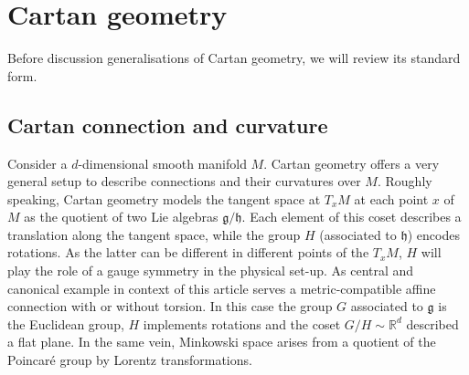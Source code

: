 \documentclass[11pt,a4paper]{article}
\numberwithin{equation}{section}
\begin{document}
\section{Cartan geometry} \label{chap:CartanGeometryOrdinary}
Before discussion generalisations of Cartan geometry, we will review its standard form.
\subsection{Cartan connection and curvature}
Consider a $d$-dimensional smooth manifold $M$. Cartan geometry offers a very general setup to describe connections and their curvatures over $M$. Roughly speaking, Cartan geometry models the tangent space at $T_x M$ at each point $x$ of $M$ as the quotient of two Lie algebras $\mathfrak{g}/\mathfrak{h}$. Each element of this coset describes a translation along the tangent space, while the group $H$ (associated to $\mathfrak{h}$) encodes rotations. As the latter can be different in different points of the $T_x M$, $H$ will play the role of a gauge symmetry in the physical set-up. As central and canonical example in context of this article serves a metric-compatible affine connection with or without torsion. In this case the group $G$ associated to $\mathfrak{g}$ is the Euclidean group, $H$ implements rotations and the coset $G/H \sim \mathbb{R}^{d}$ described a flat plane. In the same vein, Minkowski space arises from a quotient of the Poincar\'e group by Lorentz transformations.
\end{document}

